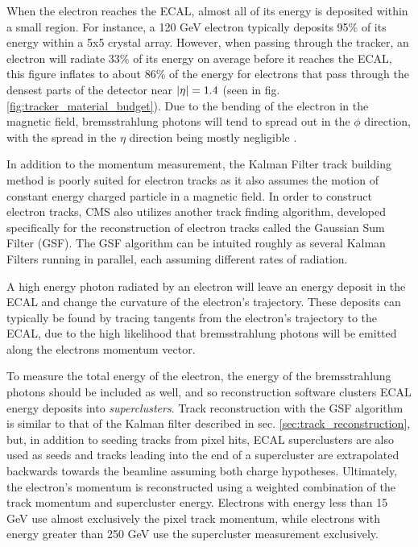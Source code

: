     When the electron reaches the ECAL, almost all of its energy is deposited within a small region. For instance, a 120 GeV electron typically deposits 95\% of its energy within a 5x5 crystal array. However, when passing through the tracker, an electron will radiate 33\% of its energy on average before it reaches the ECAL, this figure inflates to about 86\% of the energy for electrons that pass through the densest parts of the detector near $\lvert \eta \rvert = 1.4$ (seen in fig. \ref{fig:tracker_material_budget}). Due to the bending of the electron in the magnetic field, bremsstrahlung photons will tend to spread out in the $\phi$ direction, with the spread in the $\eta$ direction being mostly negligible \cite[sec. 4.1]{Electron_reco}.

    In addition to the momentum measurement, the Kalman Filter track building method is poorly suited for electron tracks as it also assumes the motion of constant energy charged particle in a magnetic field. In order to construct electron tracks, CMS also utilizes another track finding algorithm, developed specifically for the reconstruction of electron tracks called the Gaussian Sum Filter (GSF)\cite{cms_gsf}. The GSF algorithm can be intuited roughly as several Kalman Filters running in parallel, each assuming different rates of radiation. 

    A high energy photon radiated by an electron will leave an energy deposit in the ECAL and change the curvature of the electron's trajectory. These deposits can typically be found by tracing tangents from the electron's trajectory to the ECAL, due to the high likelihood that bremsstrahlung photons will be emitted along the electrons momentum vector. 

    To measure the total energy of the electron, the energy of the bremsstrahlung photons should be included as well, and so reconstruction software clusters ECAL energy deposits into \emph{superclusters}. Track reconstruction with the GSF algorithm is similar to that of the Kalman filter described in sec. \ref{sec:track_reconstruction}, but, in addition to seeding tracks from pixel hits, ECAL superclusters are also used as seeds and tracks leading into the end of a supercluster are extrapolated backwards towards the beamline assuming both charge hypotheses. Ultimately, the electron's momentum is reconstructed using a weighted combination of the track momentum and supercluster energy. Electrons with energy less than 15 GeV use almost exclusively the pixel track momentum, while electrons with energy greater than 250 GeV use the supercluster measurement exclusively. 

